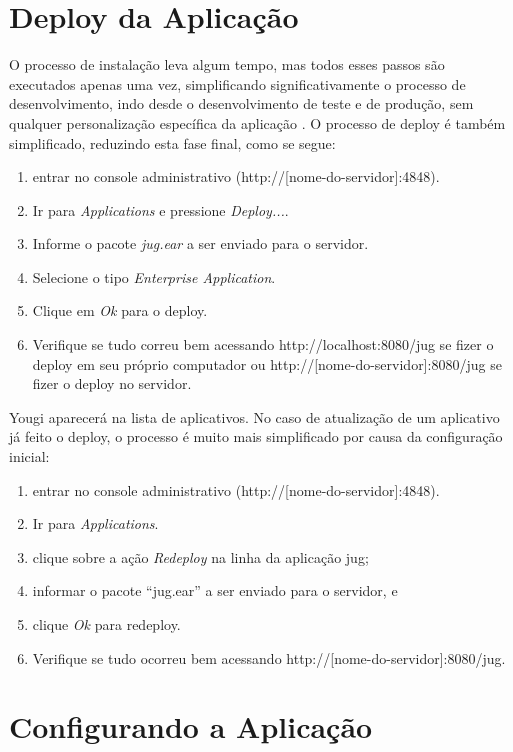 \documentclass[envcountsame,envcountchap]{svmono}
\begin{document}
\section{Deploy da Aplicação}

O processo de instalação leva algum tempo, mas todos esses passos são executados apenas uma vez, simplificando significativamente o processo de desenvolvimento, indo desde o desenvolvimento de teste e de produção, sem qualquer personalização específica da aplicação . O processo de deploy é também simplificado, reduzindo esta fase final, como se segue:

\begin{enumerate}
\item entrar no console administrativo (http://[nome-do-servidor]:4848).
\item Ir para \textit{Applications} e pressione \textit{Deploy...}.
\item Informe o pacote \textit{jug.ear} a ser enviado para o servidor.
\item Selecione o tipo \textit{Enterprise Application}.
\item Clique em \textit{Ok} para o deploy.
\item Verifique se tudo correu bem acessando http://localhost:8080/jug se fizer o deploy em seu próprio computador ou http://[nome-do-servidor]:8080/jug se fizer o deploy no servidor.
\end{enumerate}

Yougi aparecerá na lista de aplicativos. No caso de atualização de um aplicativo já feito o deploy, o processo é muito mais simplificado por causa da configuração inicial:

\begin{enumerate}
\item entrar no console administrativo (http://[nome-do-servidor]:4848).
\item Ir para \textit{Applications}.
\item clique sobre a ação \textit{Redeploy} na linha da aplicação jug;
\item informar o pacote “jug.ear” a ser enviado para o servidor, e
\item clique \textit{Ok} para redeploy.
\item Verifique se tudo ocorreu bem acessando http://[nome-do-servidor]:8080/jug.
\end{enumerate}

\section{Configurando a Aplicação}
\end{document}
